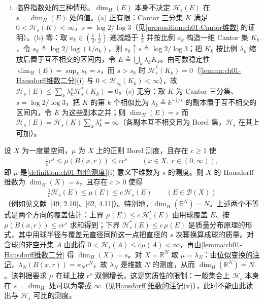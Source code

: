 \documentclass[../../main.tex]{subfiles}%
\begin{document}
\begin{remark}
\begin{enumerate}[(i)]
\item 临界指数处的三种情形。$\dim_H(E)$ 本身不决定 $\mathcal{H}_s(E)$ 在 $s=\dim_H(E)$ 处的值。(a) 正有限：Cantor 三分集 $K$ 满足 $0<\mathcal{H}_s(K)<\infty$，$s=\log2/\log3$（见\cref{proposition:ch01-Cantor维数} 的证明）。(b) 零：取 $a_k\in(\frac13,\frac12)$ 递减趋于 $\frac13$ 并按比例 $a_k$ 构造一维 Cantor 集 $K_k$，令 $s_k\triangleq\log2/\log(1/a_k)$，则 $s_k\uparrow s\triangleq\log2/\log3$；把 $K_k$ 按比例 $\lambda_k$ 缩放后置于互不相交的区间内，令 $E\triangleq\bigcup_k\lambda_kK_k$。由可数稳定性 $\dim_H(E)=\sup_ks_k=s$，而 $s>s_k$ 时 $\mathcal{H}_s^*(K_k)=0$（\cref{lemma:ch01-Hausdorff维数二分}(i) 与 $0<\mathcal{H}_{s_k}(K_k)<\infty$），故 $\mathcal{H}_s(E)\leqslant\sum_k\lambda_k^s\mathcal{H}_s^*(K_k)=0$。(c) 无穷：取 $K$ 为 Cantor 三分集、$s=\log2/\log3$，把 $K$ 的第 $k$ 个相似比为 $\lambda_k\triangleq k^{-1/s}$ 的副本置于互不相交的区间内，令 $E$ 为这些副本之并；则 $\dim_H(E)=s$ 而 $\mathcal{H}_s(E)=\mathcal{H}_s(K)\sum_k\lambda_k^s=\infty$（各副本互不相交且为 Borel 集，$\mathcal{H}_s$ 在其上可加）。
\end{enumerate}
\end{remark}

\begin{remark}\label{remark:ch01-Hausdorff维数与测度}
设 $X$ 为一度量空间，$\mu$ 为 $X$ 上的正则 Borel 测度，且存在 $c\geqslant1$ 使
\begin{align*}
\frac{1}{c}r^s\leqslant\mu(B(x,r))\leqslant cr^s\qquad(x\in X,\ r\in(0,\infty)),
\end{align*}
即 $\mu$ 是\cref{definition:ch01-加倍测度}(i) 意义下维数为 $s$ 的测度。则 $X$ 的 Hausdorff 维数为 $\dim_H(X)=s$，且存在 $c>0$ 使得
\begin{align*}
\frac{1}{c}\mathcal{H}_s(E)\leqslant\mu(E)\leqslant c\,\mathcal{H}_s(E)\qquad(E\in\mathcal{B}(X))
\end{align*}
（例如见文献~[49, 2.10]、[62, 4.11]）。特别地，$\dim_H(\mathbb{R}^N)=N$。上述两个不等式是两个方向的覆盖估计：上界 $\mu(E)\leqslant c\,\mathcal{H}_s^*(E)$ 由用球覆盖 $E$、按 $\mu(B(x,r))\leqslant cr^s$ 求和得到；下界 $\mathcal{H}_s^*(E)\leqslant c\,\mu(E)$ 是质量分布原理的形式，其中用球半径与覆盖元直径同阶这一点把直径的 $s$ 次幂换算成球的质量。对含球的非空开集 $A$ 由此得 $0<\mathcal{H}_s(A)\leqslant c\mu(A)<\infty$，再由\cref{lemma:ch01-Hausdorff维数二分} 得 $\dim_H(X)=s$。对 $X=\mathbb{R}^N$ 取 $\mu=\lambda_N$：由\hyperref[remark:ch01-位似]{位似变换的注记}，$\lambda_N(B(x,r))=\kappa_Nr^N$，故 $\lambda_N$ 是维数 $N$ 的测度，从而 $\dim_H(\mathbb{R}^N)=N$。该判据要求 $\mu$ 在球上按 $r^s$ 双侧增长，这是实质性的限制：一般集合上 $\mathcal{H}_s$ 本身在 $s=\dim_H$ 处可以为零或 $\infty$（见\hyperref[remark:ch01-Hausdorff维数]{Hausdorff 维数的注记}(v)），此时不能由此读出与 $\mathcal{H}_s$ 可比的测度。
\end{remark}
\end{document}
